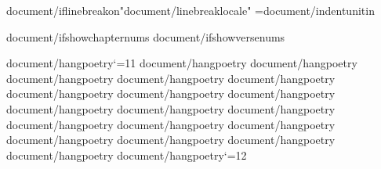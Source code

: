 {document/iflinebreakon}\XeTeXlinebreaklocale "{document/linebreaklocale}"
={document/indentunit}in

{document/ifshowchapternums}\OmitChapterNumbertrue
\def\AfterChapterSpaceFactor{{{document/afterchapterspace}}}
{document/ifshowversenums}\def\AfterVerseSpaceFactor{{{document/afterversespace}}}

{document/hangpoetry}\catcode`\@=11
{document/hangpoetry}
{document/hangpoetry}
{document/hangpoetry}
{document/hangpoetry}
{document/hangpoetry}
{document/hangpoetry}
{document/hangpoetry}
{document/hangpoetry}
{document/hangpoetry}
{document/hangpoetry}
{document/hangpoetry}
{document/hangpoetry}
{document/hangpoetry}
{document/hangpoetry}
{document/hangpoetry}
{document/hangpoetry}
{document/hangpoetry}
{document/hangpoetry}
{document/hangpoetry}\catcode`\@=12


